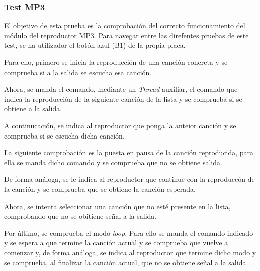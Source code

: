 \subsubsection{Test MP3}

El objetivo de esta prueba es la comprobación del correcto funcionamiento del módulo del reproductor MP3. Para navegar entre las direfentes pruebas de este test, se ha utilizador el botón azul (B1) de la propia placa.

Para ello, primero se inicia la reproducción de una canción concreta y se comprueba si a la salida se escucha esa canción.

Ahora, se manda el comando, mediante un \textit{Thread} auxiliar, el comando que indica la reproducción de la siguiente canción de la lista y se comprueba si se obtiene a la salida.

A continucación, se indica al reproductor que ponga la anteior canción y se comprueba si se escucha dicha canción.

La siguiente comprobación es la puesta en pausa de la canción reproducida, para ella se manda dicho comando y se comprueba que no se obtiene salida.

De forma análoga, se le indica al reproductor que continue con la reproduccón de la canción y se comprueba que se obtiene la canción esperada.

Ahora, se intenta seleccionar una canción que no esté presente en la lista, comprobando que no se obitiene señal a la salida.

Por último, se comprueba el modo \textit{loop}. Para ello se manda el comando indicado y se espera a que termine la canción actual y se comprueba que vuelve a comenzar y, de forma análoga, se indica al reproductor que termine dicho modo y se comprueba, al finalizar la canción actual, que no se obtiene señal a la salida.